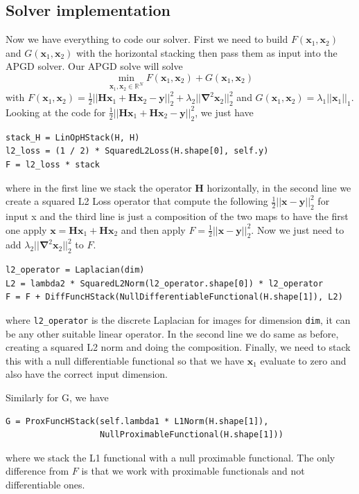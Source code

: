 \documentclass[a4paper,11pt,oneside]{report}
\theoremstyle{named}
\begin{document}
\subsection{Solver implementation}
Now we have everything to code our solver. First we need to build $F(\boldsymbol{x}_1, \boldsymbol{x}_2)$ and $G(\boldsymbol{x}_1, \boldsymbol{x}_2)$ with the horizontal stacking then pass them as input into the APGD solver. Our APGD solve will solve
\begin{equation*}
    \min_{\boldsymbol{x}_1, \boldsymbol{x}_2 \in \mathbb{R}^N} F(\boldsymbol{x}_1, \boldsymbol{x}_2) + G(\boldsymbol{x}_1, \boldsymbol{x}_2)
\end{equation*}
with $F(\boldsymbol{x}_1, \boldsymbol{x}_2) = \frac{1}{2} ||\boldsymbol{H x}_1 + \boldsymbol{H x}_2 - \boldsymbol{y}||_2^2 + \lambda_2 || \boldsymbol{\nabla}^2 \boldsymbol{x}_2||_2^2$ and $G(\boldsymbol{x}_1, \boldsymbol{x}_2) = \lambda_1 ||\boldsymbol{x}_1||_1$.
Looking at the code for $\frac{1}{2} ||\boldsymbol{H x}_1 + \boldsymbol{H x}_2 - \boldsymbol{y}||_2^2$, we just have
\begin{verbatim}
stack_H = LinOpHStack(H, H)
l2_loss = (1 / 2) * SquaredL2Loss(H.shape[0], self.y)
F = l2_loss * stack
\end{verbatim}
where in the first line we stack the operator $\boldsymbol{H}$ horizontally, in the second line we create a squared L2 Loss operator that compute the following $\frac{1}{2} ||\boldsymbol{x} - \boldsymbol{y}||_2^2$ for input x and the third line is just a composition of the two maps to have the first one apply $\boldsymbol{x} = \boldsymbol{H x}_1 + \boldsymbol{H x}_2$ and then apply $F = \frac{1}{2} ||\boldsymbol{x} - \boldsymbol{y}||_2^2$. Now we just need to add $\lambda_2 || \boldsymbol{\nabla}^2 \boldsymbol{x}_2||_2^2$ to $F$. 
\begin{verbatim}
l2_operator = Laplacian(dim)
L2 = lambda2 * SquaredL2Norm(l2_operator.shape[0]) * l2_operator
F = F + DiffFuncHStack(NullDifferentiableFunctional(H.shape[1]), L2)
\end{verbatim}
where \verb+l2_operator+ is the discrete Laplacian for images for dimension \verb+dim+, it can be any other suitable linear operator. In the second line we do same as before, creating a squared L2 norm and doing the composition. Finally, we need to stack this with a null differentiable functional so that we have $\boldsymbol{x}_1$ evaluate to zero and also have the correct input dimension. 

Similarly for G, we have
\begin{verbatim}
G = ProxFuncHStack(self.lambda1 * L1Norm(H.shape[1]), 
                   NullProximableFunctional(H.shape[1]))
\end{verbatim}
where we stack the L1 functional with a null proximable functional. The only difference from $F$ is that we work with proximable functionals and not differentiable ones. 
\end{document}
